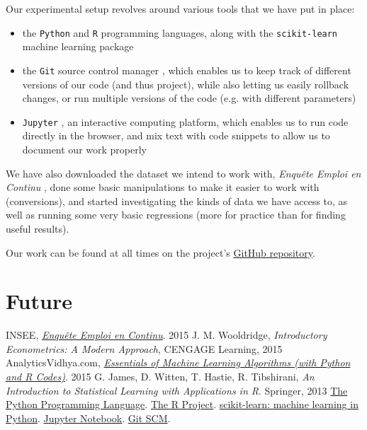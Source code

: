 \documentclass[a4paper]{article}
\begin{document}
Our experimental setup revolves around various tools that we have put in place:
\begin{itemize}
    \item the \texttt{Python} and \texttt{R} programming languages, along with the \texttt{scikit-learn} machine learning package \cite{python}\cite{R}\cite{learn}
    \item the \texttt{Git} source control manager \cite{git}, which enables us to keep track of different versions of our code (and thus project), while also letting us easily rollback changes, or run multiple versions of the code (e.g. with different parameters)
    \item \texttt{Jupyter} \cite{jupyter}, an interactive computing platform, which enables us to run code directly in the browser, and mix text with code snippets to allow us to document our work properly
\end{itemize}

We have also downloaded the dataset we intend to work with, \emph{Enqu\^ete Emploi en Continu} \cite{enquete}, done some basic manipulations to make it easier to work with (conversions), and started investigating the kinds of data we have access to, as well as running some very basic regressions (more for practice than for finding useful results).

Our work can be found at all times on the project's \href{https://github.com/ncocacola/econml/}{GitHub repository}.

\section{Future}
\clearpage
\begin{thebibliography}{9}
        INSEE,
        \href{https://www.insee.fr/fr/statistiques/2388681}{\emph{Enqu\^ete Emploi en Continu}}.
        2015
        J. M. Wooldridge,
        \emph{Introductory Econometrics: A Modern Approach},
        CENGAGE Learning,
        2015
        AnalyticsVidhya.com,
        \href{https://www.analyticsvidhya.com/blog/2015/08/common-machine-learning-algorithms/}{\emph{Essentials of Machine Learning Algorithms (with Python and R Codes)}}.
        2015
        G. James, D. Witten, T. Hastie, R. Tibshirani,
        \emph{An Introduction to Statistical Learning with Applications in R}.
        Springer,
        2013
        \href{https://www.python.org/}{The Python Programming Language}.
        \href{https://www.r-project.org/}{The R Project}.
        \href{http://scikit-learn.org/}{scikit-learn: machine learning in Python}.
        \href{https://jupyter.org/}{Jupyter Notebook}.
        \href{https://git-scm.com/}{Git SCM}.
\end{thebibliography}
\end{document}
